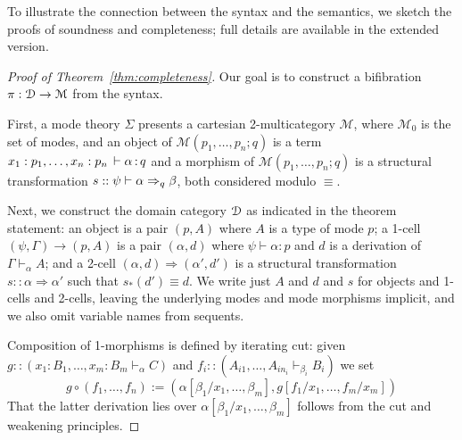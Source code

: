 \documentclass[a4paper,USenglish,numberwithinsect]{lipics-v2016}
\newcommand\deq{\ensuremath{\equiv}}
\newcommand\spr{\ensuremath{\Rightarrow}} %
\newcommand\seq[3]{\ensuremath{#1 \vdash_{#2} #3}}
\renewcommand{\oftp}[3]{\ensuremath{#1 \, \vdash #2 \, \dcd{:} \, #3}}
\def\M{\mathcal{M}}
\newcommand\Trd[2]{\ensuremath{#1_*(#2)}}
\begin{document}
To illustrate the connection between the syntax and the semantics, we
sketch the proofs of soundness and completeness; full details are
available in the extended version.

\begin{proof}[Proof of Theorem~\ref{thm:completeness}]
Our goal is to construct a bifibration $\pi : \cD \to \M$ from the
syntax.

First, a mode theory $\Sigma$ presents a cartesian 2-multicategory $\M$,
where $\M_0$ is the set of modes, and an object of
$\M(p_1,\ldots,p_n;q)$ is a term
$\oftp{x_1:p_1,\ldots,x_n:p_n}{\alpha}{q}$ and a morphism of
$\M(p_1,\ldots,p_n;q)$ is a structural transformation $s ::
\wfsp{\psi}{\alpha}{\beta}{q}$, both considered modulo $\deq$.

Next, we construct the domain category $\mathcal{D}$ as indicated in the theorem
statement: an object is a pair $(p,A)$ where $A$ is a type of mode $p$;
a 1-cell $(\psi,\Gamma) \to (p,A)$ is a pair $(\alpha,d)$ where $\psi
\vdash \alpha : p$ and $d$ is a derivation of \seq{\Gamma}{\alpha}{A};
and a 2-cell $(\alpha, d) \Rightarrow (\alpha', d')$ is a structural
transformation $s :: \alpha \spr \alpha'$ such that $\Trd{s}{d'} \deq
d$.  We write just $A$ and $d$ and $s$ for objects and 1-cells and
2-cells, leaving the underlying modes and mode morphisms implicit, and
we also omit variable names from sequents.

Composition of 1-morphisms is defined by iterating cut: given 
$g :: (\seq{x_1 : B_1, \dots, x_m : B_m}{\alpha}{C})$ and 
$f_i :: (\seq{A_{i1}, \dots, A_{in_i}}{\beta_i}{B_i})$ 
we set \[g \circ (f_1, \dots, f_n) := (\alpha[\beta_1/x_1, \dots, \beta_m], g[f_1/x_1, \dots, f_m/x_m])\]
That the latter derivation lies over $\alpha[\beta_1/x_1, \dots,
  \beta_m]$ follows from the cut and weakening principles.  


\end{proof}
\end{document}
